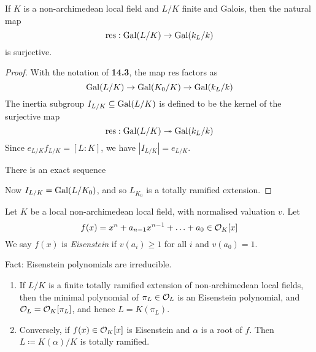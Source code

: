 \documentclass[10pt,a4paper]{article}
\begin{document}
\begin{corollary}
  If $K$ is a non-archimedean local field and $L/K$ finite and Galois, then the natural map
  \[\text{res}:\operatorname{Gal}(L/K) \to \operatorname{Gal}(k_L/k)\]
  is surjective.
\end{corollary}
\begin{proof}
  With the notation of \textbf{14.3}, the map $\text{res}$ factors as
  \[\operatorname{Gal}(L/K) \to \operatorname{Gal}(K_0/K) \to \operatorname{Gal}(k_L/k)\]
  The inertia subgroup $I_{L/K} \subseteq \operatorname{Gal}(L/K)$ is defined to be the kernel of the surjective map
  \[ \text{res}:\operatorname{Gal}(L/K) \twoheadrightarrow \operatorname{Gal}(k_L/k)\]
  Since $e_{L/K} f_{L/K} = [L:K]$, we have $|I_{L/K}| = e_{L/K}$.

  There is an exact sequence
  \begin{center}
  \end{center}
  Now $I_{L/K} = \operatorname{Gal}(L/K_0)$, and so $L_{K_0}$ is a totally ramified extension.
\end{proof}
\begin{definition}
  Let $K$ be a local non-archimedean local field, with normalised valuation $v$. Let
  \[f(x) = x^n + a_{n-1}x^{n-1}+\ldots+a_0 \in \mathcal{O}_K[x]\]
  We say $f(x)$ is \emph{Eisenstein} if $v(a_i) \geq 1$ for all $i$ and $v(a_0) = 1$.
\end{definition}
Fact: Eisenstein polynomials are irreducible.
\begin{theorem}\hspace*{0cm}
  \begin{enumerate}
    \item If $L/K$ is a finite totally ramified extension of non-archimedean local fields, then the minimal polynomial of $\pi_L \in \mathcal{O}_L$ is an Eisenstein polynomial, and $\mathcal{O}_L = \mathcal{O}_K[\pi_L]$, and hence $L = K(\pi_L)$.
    \item Conversely, if $f(x) \in \mathcal{O}_K[x]$ is Eisenstein and $\alpha$ is a root of $f$. Then $L \coloneqq K(\alpha)/K$ is totally ramified.
  \end{enumerate}
\end{theorem}
\end{document}
